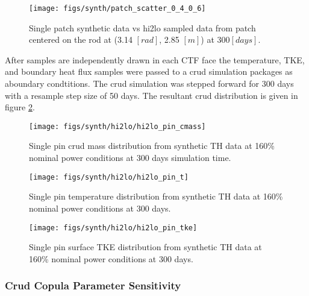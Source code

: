 \begin{figure}[H]
    \centering
    \texttt{[image: figs/synth/patch\_scatter\_0\_4\_0\_6]}
    \caption[Single patch synthetic CFD data vs hi2lo sampled data.]{Single patch synthetic data vs hi2lo sampled data from patch centered on the rod at (3.14 $[rad]$, 2.85 $[m]$) at 300$[days]$.}
    \label{fig:patchscatter}
\end{figure}

After samples are independently drawn in each CTF face the temperature, TKE, and boundary heat flux samples were passed to a crud simulation packages as aboundary condtitions.  The crud simulation was stepped forward for 300 days with a resample step size of 50 days.  The resultant crud distribution is given in figure \ref{fig:hi2lopincmass}.

\begin{figure}[H]
    \centering
    \texttt{[image: figs/synth/hi2lo/hi2lo\_pin\_cmass]}
    \caption[Single pin crud mass distribution from synthetic TH data.]{Single pin crud mass distribution from synthetic TH data at 160\% nominal power conditions at 300 days simulation time.}
    \label{fig:hi2lopincmass}
\end{figure}
\begin{figure}[H]
    \centering
    \texttt{[image: figs/synth/hi2lo/hi2lo\_pin\_t]}
    \caption{Single pin temperature distribution from synthetic TH data at 160\% nominal power conditions at 300 days.}
    \label{fig:hi2lopint}
\end{figure}
\begin{figure}[H]
    \centering
    \texttt{[image: figs/synth/hi2lo/hi2lo\_pin\_tke]}
    \caption{Single pin surface TKE distribution from synthetic TH data at 160\% nominal power conditions at 300 days.}
    \label{fig:hi2lopintke}
\end{figure}


\subsubsection{Crud Copula Parameter Sensitivity}
\label{sec:crud_copula_sensi}


